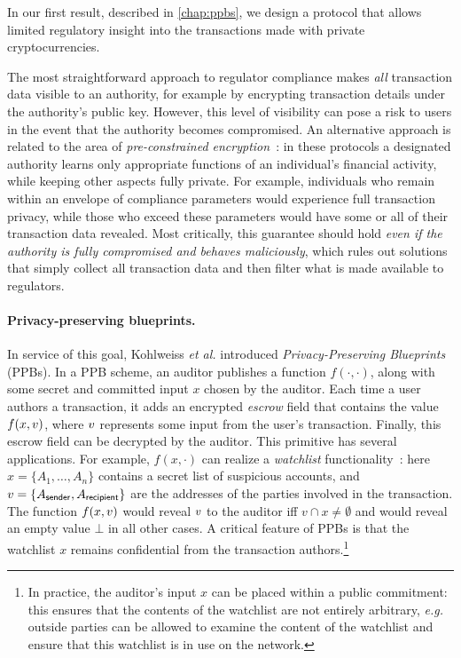 
In our first result, described in \cref{chap:ppbs}, we design a protocol that allows limited regulatory insight into the transactions made with private cryptocurrencies.


The most straightforward approach to regulator compliance makes \emph{all} transaction data visible to an authority, for example by encrypting transaction details under the authority's public key.
However, this level of visibility can pose a risk to users in the event that the authority becomes compromised.
An alternative approach is related to the area of \emph{pre-constrained encryption}~\cite{ITCS:AJJM22}: in these protocols a designated authority learns only appropriate functions of an individual's financial activity, while keeping other aspects fully private. %
For example, individuals who remain within an envelope of compliance parameters would experience full transaction privacy, while those who exceed these parameters would have some or all of their transaction data revealed.
Most critically, this guarantee should hold \emph{even if the authority is fully compromised and behaves maliciously}, which rules out solutions that simply collect all transaction data and then filter what is made available to regulators.

\paragraph{Privacy-preserving blueprints.}
In service of this goal, Kohlweiss \emph{et al.} \cite{EC:KohLysNgu23} introduced \emph{Privacy-Preserving Blueprints} (PPBs).
In a PPB scheme, an auditor publishes a function $f(\cdot, \cdot)$, along with some secret and committed input $x$ chosen by the auditor.
Each time a user authors a transaction, it adds an encrypted \emph{escrow} field that contains the value $f(x, v)$, where $v$ represents some input from the user's transaction.
Finally, this escrow field can be decrypted by the auditor.
This primitive has several applications.
For example,  $f(x, \cdot)$ can realize a \emph{watchlist} functionality~\cite{EC:KohLysNgu23,EPRINT:GKLS24}: here $x = \{A_1, \dots, A_n\}$ contains a secret list of suspicious accounts, and $v = \{A_{\sf sender}, A_{\sf recipient}\}$ are the addresses of the parties involved in the transaction.
The function $f(x, v)$ would reveal $v$ to the auditor iff $v \cap x \ne \emptyset$ and would reveal an empty value $\bot$ in all other cases.
A critical feature of PPBs is that the watchlist $x$ remains confidential from the transaction authors.\footnote{In practice, the auditor's input $x$ can be placed within a public commitment: this ensures that the contents of the watchlist are not entirely arbitrary, \emph{e.g.} outside parties can be allowed to examine the content of the watchlist and ensure that this watchlist is in use on the network.}

